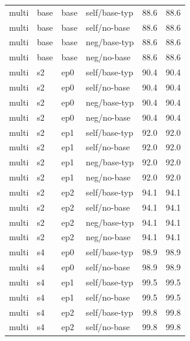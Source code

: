 {\begin{longtable}{llll rr}
\midrule
multi & base & base & self/base-typ & 88.6 & 88.6 \\
multi & base & base & self/no-base & 88.6 & 88.6 \\
multi & base & base & neg/base-typ & 88.6 & 88.6 \\
multi & base & base & neg/no-base & 88.6 & 88.6 \\
multi & s2 & ep0 & self/base-typ & 90.4 & 90.4 \\
multi & s2 & ep0 & self/no-base & 90.4 & 90.4 \\
multi & s2 & ep0 & neg/base-typ & 90.4 & 90.4 \\
multi & s2 & ep0 & neg/no-base & 90.4 & 90.4 \\
multi & s2 & ep1 & self/base-typ & 92.0 & 92.0 \\
multi & s2 & ep1 & self/no-base & 92.0 & 92.0 \\
multi & s2 & ep1 & neg/base-typ & 92.0 & 92.0 \\
multi & s2 & ep1 & neg/no-base & 92.0 & 92.0 \\
multi & s2 & ep2 & self/base-typ & 94.1 & 94.1 \\
multi & s2 & ep2 & self/no-base & 94.1 & 94.1 \\
multi & s2 & ep2 & neg/base-typ & 94.1 & 94.1 \\
multi & s2 & ep2 & neg/no-base & 94.1 & 94.1 \\
multi & s4 & ep0 & self/base-typ & 98.9 & 98.9 \\
multi & s4 & ep0 & self/no-base & 98.9 & 98.9 \\
multi & s4 & ep1 & self/base-typ & 99.5 & 99.5 \\
multi & s4 & ep1 & self/no-base & 99.5 & 99.5 \\
multi & s4 & ep2 & self/base-typ & 99.8 & 99.8 \\
multi & s4 & ep2 & self/no-base & 99.8 & 99.8 \\
\bottomrule
\end{longtable}
}
